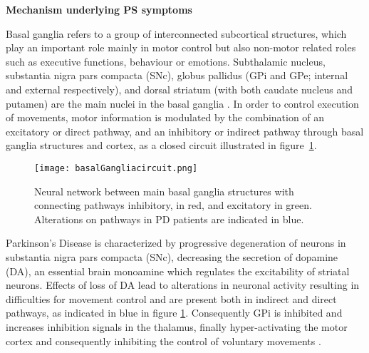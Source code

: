 
\textbf{Mechanism underlying PS symptoms}

Basal ganglia refers to a group of  interconnected subcortical structures, which play an important role mainly in motor control but also non-motor related roles such as executive functions, behaviour or emotions. Subthalamic nucleus, substantia nigra pars compacta (SNc), globus pallidus (GPi and GPe; internal and external respectively), and dorsal striatum (with both caudate nucleus and putamen) are the main nuclei in the basal ganglia \cite{Fahn2011} .%
In order to control execution of movements, motor information is modulated by the combination of an excitatory or direct pathway, and an inhibitory or indirect pathway through basal ganglia structures and cortex, as a closed circuit illustrated in figure~\ref{fig:basalGanglia}.

\begin{figure}[!htb]
     \centering    
         \texttt{[image: basalGangliacircuit.png]} 
       \caption{Neural network between main basal ganglia structures with connecting pathways inhibitory, in red, and excitatory in green. Alterations on pathways in PD patients are indicated in blue.}
     \label{fig:basalGanglia}
\end{figure} 

Parkinson's Disease is characterized by progressive degeneration of neurons in substantia nigra pars compacta (SNc), decreasing the secretion of dopamine (DA), an essential brain monoamine which regulates the excitability of striatal neurons. 
Effects of loss of DA lead to alterations in neuronal activity resulting in difficulties for movement control and are present both in indirect and direct pathways, as indicated in blue in  figure \ref{fig:basalGanglia}. Consequently GPi is inhibited and increases inhibition signals in the thalamus, finally hyper-activating the motor cortex and consequently inhibiting the control of voluntary movements \cite{Maiti2017}.%
\\

